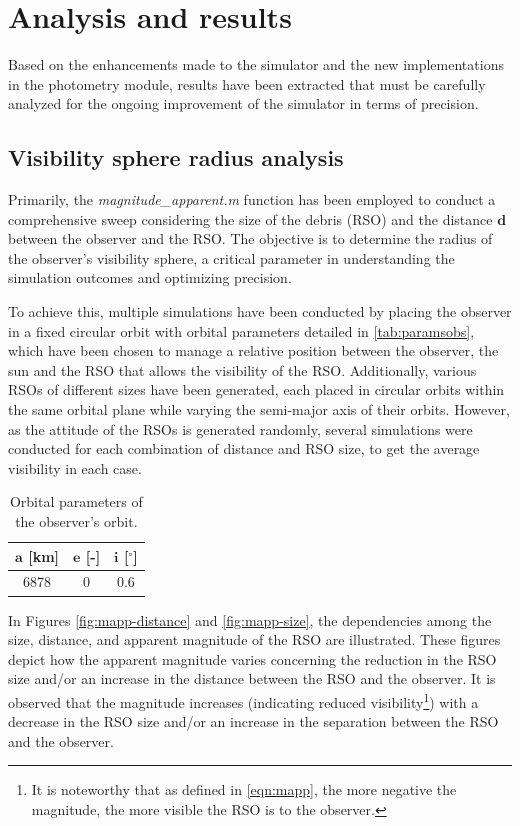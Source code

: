 \section{Analysis and results}\label{s: resultados}
Based on the enhancements made to the simulator and the new implementations in the photometry module, results have been extracted that must be carefully analyzed for the ongoing improvement of the simulator in terms of precision.

\subsection{Visibility sphere radius analysis}
Primarily, the \textit{magnitude\_apparent.m} function has been employed to conduct a comprehensive sweep considering the size of the debris (RSO) and the distance $\mathbf{d}$ between the observer and the RSO. The objective is to determine the radius of the observer's visibility sphere, a critical parameter in understanding the simulation outcomes and optimizing precision. 

To achieve this, multiple simulations have been conducted by placing the observer in a fixed circular orbit with orbital parameters detailed in \autoref{tab:paramsobs}, which have been chosen to manage a relative position between the observer, the sun and the RSO that allows the visibility of the RSO. Additionally, various RSOs of different sizes have been generated, each placed in circular orbits within the same orbital plane while varying the semi-major axis of their orbits. However, as the attitude of the RSOs is generated randomly, several simulations were conducted for each combination of distance and RSO size, to get the average visibility in each case.

 
\begin{table}[H]
    \centering
    \caption{Orbital parameters of the observer's orbit.}
    \begin{tabular}{ccc}
    \toprule
    $\boldsymbol{a}$ [km] & $\boldsymbol{e}$ [-] & $\boldsymbol{i}$ [$^\circ$] \\
    \midrule
      6878  & 0  & 0.6 \\
    \bottomrule
    \end{tabular}
    \label{tab:paramsobs}
\end{table}
    

In Figures \ref{fig:mapp-distance} and \ref{fig:mapp-size}, the dependencies among the size, distance, and apparent magnitude of the RSO are illustrated. These figures depict how the apparent magnitude varies concerning the reduction in the RSO size and/or an increase in the distance between the RSO and the observer. It is observed that the magnitude increases (indicating reduced visibility\footnote{It is noteworthy that as defined in \autoref{eqn:mapp}, the more negative the magnitude, the more visible the RSO is to the observer.}) with a decrease in the RSO size and/or an increase in the separation between the RSO and the observer.

